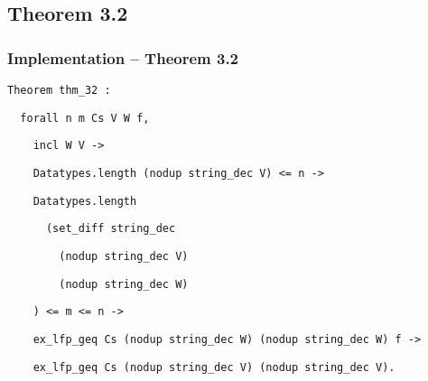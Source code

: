 \documentclass[slides]{beamer}
\begin{document}
\subsection{Theorem 3.2}

\begin{frame}[fragile]
    \frametitle{Implementation – Theorem 3.2}

    \begin{minipage}{\linewidth}\lstinline{Theorem thm_32 :}\end{minipage}
    \begin{minipage}{\linewidth}\lstinline{  forall n m Cs V W f,}\end{minipage}
    \begin{minipage}{\linewidth}\lstinline{    incl W V ->}\end{minipage}
    \begin{minipage}{\linewidth}\lstinline{    Datatypes.length (nodup string_dec V) <= n ->}\end{minipage}
    \begin{minipage}{\linewidth}\lstinline{    Datatypes.length}\end{minipage}
    \begin{minipage}{\linewidth}\lstinline{      (set_diff string_dec}\end{minipage}
    \begin{minipage}{\linewidth}\lstinline{        (nodup string_dec V)}\end{minipage}
    \begin{minipage}{\linewidth}\lstinline{        (nodup string_dec W)}\end{minipage}
    \begin{minipage}{\linewidth}\lstinline{    ) <= m <= n ->}\end{minipage}
    \begin{minipage}{\linewidth}\lstinline{    ex_lfp_geq Cs (nodup string_dec W) (nodup string_dec W) f ->}\end{minipage}
    \begin{minipage}{\linewidth}\lstinline{    ex_lfp_geq Cs (nodup string_dec V) (nodup string_dec V).}\end{minipage}
\end{frame}
\end{document}
